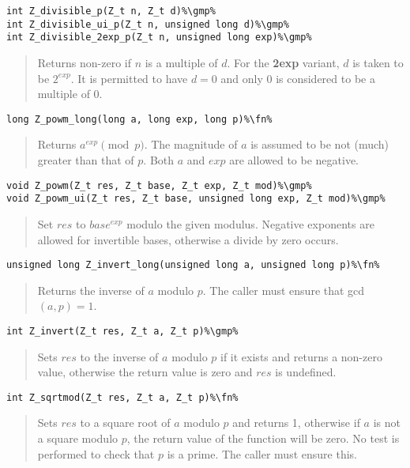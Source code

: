 \documentclass[a4paper,10pt]{article}
\newcommand{\fn}{\hfill[Function]}
\newcommand{\gmp}{\hfill[GMP]}
\begin{document}
\begin{lstlisting}
int Z_divisible_p(Z_t n, Z_t d)%\gmp%
int Z_divisible_ui_p(Z_t n, unsigned long d)%\gmp%
int Z_divisible_2exp_p(Z_t n, unsigned long exp)%\gmp%
\end{lstlisting}
\begin{quote}Returns non-zero if $n$ is a multiple of $d$. For the \textbf{2exp} variant, $d$ is taken to be $2^{exp}$. It is permitted to have $d = 0$ and only $0$ is considered to be a multiple of $0$.\end{quote}

\begin{lstlisting}
long Z_powm_long(long a, long exp, long p)%\fn%
\end{lstlisting}
\begin{quote}Returns $a^{exp} \pmod{p}$. The magnitude of $a$ is assumed to be not (much) greater than that of $p$. Both $a$ and $exp$ are allowed to be negative.\end{quote}

\begin{lstlisting}
void Z_powm(Z_t res, Z_t base, Z_t exp, Z_t mod)%\gmp%
void Z_powm_ui(Z_t res, Z_t base, unsigned long exp, Z_t mod)%\gmp%
\end{lstlisting}
\begin{quote}Set $res$ to $base^{exp}$ modulo the given modulus. Negative exponents are allowed for invertible bases, otherwise a divide by zero occurs.\end{quote}

\begin{lstlisting}
unsigned long Z_invert_long(unsigned long a, unsigned long p)%\fn%
\end{lstlisting}
\begin{quote}Returns the inverse of $a$ modulo $p$. The caller must ensure that gcd$(a,p) = 1$.\end{quote}

\begin{lstlisting}
int Z_invert(Z_t res, Z_t a, Z_t p)%\gmp%
\end{lstlisting}
\begin{quote}Sets $res$ to the inverse of $a$ modulo $p$ if it exists and returns a non-zero value, otherwise the return value is zero and $res$ is undefined.\end{quote}

\begin{lstlisting}
int Z_sqrtmod(Z_t res, Z_t a, Z_t p)%\fn%
\end{lstlisting}
\begin{quote}Sets $res$ to a square root of $a$ modulo $p$ and returns 1, otherwise if $a$ is not a square modulo $p$, the return value of the function will be zero. No test is performed to check that $p$ is a prime. The caller must ensure this.\end{quote}
\end{document}
